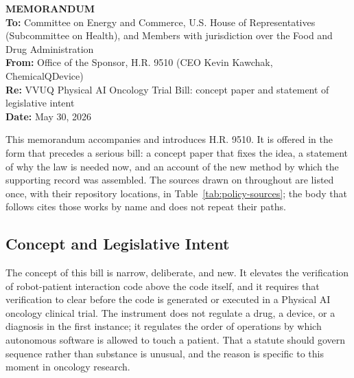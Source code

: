 
\begin{flushleft}
\textbf{MEMORANDUM}\\[3pt]
\textbf{To:}\hspace{0.5cm} Committee on Energy and Commerce, U.S. House of Representatives
(Subcommittee on Health), and Members with jurisdiction over the Food and Drug
Administration\\
\textbf{From:}\hspace{0.0cm} Office of the Sponsor, H.R. 9510 (CEO Kevin Kawchak,
ChemicalQDevice)\\
\textbf{Re:}\hspace{0.45cm} VVUQ Physical AI Oncology Trial Bill: concept paper and
statement of legislative intent\\
\textbf{Date:}\hspace{0.1cm} May 30, 2026
\end{flushleft}

This memorandum accompanies and introduces H.R. 9510. It is offered in the form
that precedes a serious bill: a concept paper that fixes the idea, a statement of
why the law is needed now, and an account of the new method by which the
supporting record was assembled. The sources drawn on throughout are listed once,
with their repository locations, in Table~\ref{tab:policy-sources}; the body that
follows cites those works by name and does not repeat their paths.

\subsection{Concept and Legislative Intent}

The concept of this bill is narrow, deliberate, and new. It elevates the
verification of robot-patient interaction code above the code itself, and it
requires that verification to clear before the code is generated or executed in a
Physical AI oncology clinical trial. The instrument does not regulate a drug, a
device, or a diagnosis in the first instance; it regulates the order of
operations by which autonomous software is allowed to touch a patient. That a
statute should govern sequence rather than substance is unusual, and the reason
is specific to this moment in oncology research.

